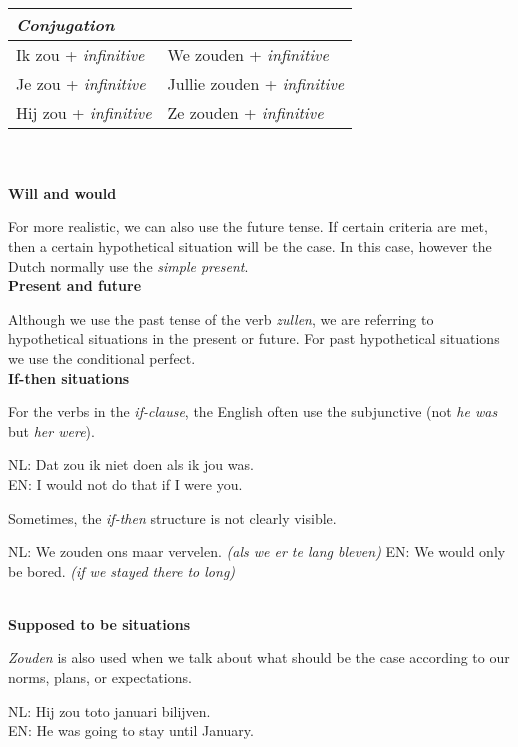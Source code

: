 \documentclass[letterpaper,11pt]{article}
\begin{document}
\\
\begin{tabular}[t]{l l}
    \textit{Conjugation} \\
    \hline
    Ik zou + \textit{infinitive} & We zouden + \textit{infinitive} \\
    Je zou + \textit{infinitive} & Jullie zouden + \textit{infinitive} \\
    Hij zou + \textit{infinitive} & Ze zouden + \textit{infinitive} \\
    \hline
\end{tabular}
\\ \\
\textbf{Will and would}
\par{For more realistic, we can also use the future tense. If certain
    criteria are met, then a certain hypothetical situation will be the case. In
this case, however the Dutch normally use the \textit{simple present}.}
\\
\textbf{Present and future} 
\par{Although we use the past tense of the verb \textit{zullen}, we are
    referring to hypothetical situations in the present or future. For past
hypothetical situations we use the conditional perfect.}
\\
\textbf{If-then situations}
\par{For the verbs in the \textit{if-clause}, the English often use the
subjunctive (not \textit{he was} but \textit{her were}).} 
\begin{small}
    NL: Dat zou ik niet doen als ik jou was.\\
    EN: I would not do that if I were you.
\end{small}
\par{Sometimes, the \textit{if-then} structure is not clearly visible.}
\begin{small}
    NL: We zouden ons maar vervelen. \textit{(als we er te lang bleven)}
    EN: We would only be bored. \textit{(if we stayed there to long)}
\end{small}
\\
\textbf{Supposed to be situations}
\par{\textit{Zouden} is also used when we talk about what should be the case
according to our norms, plans, or expectations.} \\
\begin{small}
    NL: Hij zou toto januari bilijven. \\
    EN: He was going to stay until January. \\
\end{small}
\end{document}

